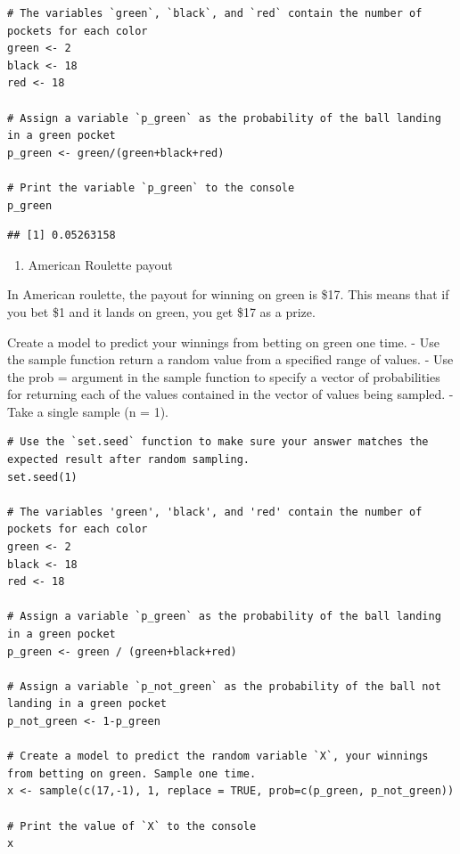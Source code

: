 \documentclass[
]{article}
\providecommand{\tightlist}{%
  \setlength{\itemsep}{0pt}\setlength{\parskip}{0pt}}
\begin{document}
\begin{verbatim}
# The variables `green`, `black`, and `red` contain the number of pockets for each color
green <- 2
black <- 18
red <- 18

# Assign a variable `p_green` as the probability of the ball landing in a green pocket
p_green <- green/(green+black+red)

# Print the variable `p_green` to the console
p_green
\end{verbatim}

\begin{verbatim}
## [1] 0.05263158
\end{verbatim}

\begin{enumerate}
\def\labelenumi{\arabic{enumi}.}
\setcounter{enumi}{1}
\tightlist
\item
  American Roulette payout
\end{enumerate}

In American roulette, the payout for winning on green is \$17. This
means that if you bet \$1 and it lands on green, you get \$17 as a
prize.

Create a model to predict your winnings from betting on green one time.
- Use the sample function return a random value from a specified range
of values. - Use the prob = argument in the sample function to specify a
vector of probabilities for returning each of the values contained in
the vector of values being sampled. - Take a single sample (n = 1).

\begin{verbatim}
# Use the `set.seed` function to make sure your answer matches the expected result after random sampling.
set.seed(1)

# The variables 'green', 'black', and 'red' contain the number of pockets for each color
green <- 2
black <- 18
red <- 18

# Assign a variable `p_green` as the probability of the ball landing in a green pocket
p_green <- green / (green+black+red)

# Assign a variable `p_not_green` as the probability of the ball not landing in a green pocket
p_not_green <- 1-p_green

# Create a model to predict the random variable `X`, your winnings from betting on green. Sample one time.
x <- sample(c(17,-1), 1, replace = TRUE, prob=c(p_green, p_not_green))

# Print the value of `X` to the console
x
\end{verbatim}
\end{document}
